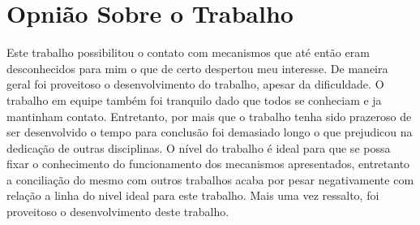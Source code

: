 \chapter{Opnião Sobre o Trabalho}
Este trabalho possibilitou o contato com mecanismos que até então eram desconhecidos para mim o que de certo despertou meu interesse. De maneira geral foi proveitoso o desenvolvimento do trabalho, apesar da dificuldade. O trabalho em equipe também foi tranquilo dado que todos se conheciam e ja mantinham contato. Entretanto, por mais que o trabalho tenha sido prazeroso de ser desenvolvido o tempo para conclusão foi demasiado longo o que prejudicou na dedicação de outras disciplinas. O nível do trabalho é ideal para que se possa fixar o conhecimento do funcionamento dos mecanismos apresentados, entretanto a conciliação do mesmo com outros trabalhos acaba por pesar negativamente com relação a linha do nivel ideal para este trabalho. Mais uma vez ressalto, foi proveitoso o desenvolvimento deste trabalho. 